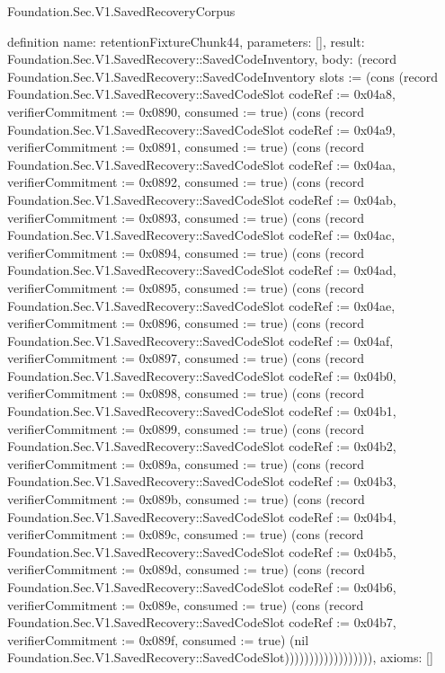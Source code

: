 \begin{lexlean}{Foundation.Sec.V1.SavedRecoveryCorpus}
\begin{semanticmodule}
definition{
  name: retentionFixtureChunk44,
  parameters: [],
  result: Foundation.Sec.V1.SavedRecovery::SavedCodeInventory,
  body: (record Foundation.Sec.V1.SavedRecovery::SavedCodeInventory {slots := (cons (record Foundation.Sec.V1.SavedRecovery::SavedCodeSlot {codeRef := 0x04a8, verifierCommitment := 0x0890, consumed := true}) (cons (record Foundation.Sec.V1.SavedRecovery::SavedCodeSlot {codeRef := 0x04a9, verifierCommitment := 0x0891, consumed := true}) (cons (record Foundation.Sec.V1.SavedRecovery::SavedCodeSlot {codeRef := 0x04aa, verifierCommitment := 0x0892, consumed := true}) (cons (record Foundation.Sec.V1.SavedRecovery::SavedCodeSlot {codeRef := 0x04ab, verifierCommitment := 0x0893, consumed := true}) (cons (record Foundation.Sec.V1.SavedRecovery::SavedCodeSlot {codeRef := 0x04ac, verifierCommitment := 0x0894, consumed := true}) (cons (record Foundation.Sec.V1.SavedRecovery::SavedCodeSlot {codeRef := 0x04ad, verifierCommitment := 0x0895, consumed := true}) (cons (record Foundation.Sec.V1.SavedRecovery::SavedCodeSlot {codeRef := 0x04ae, verifierCommitment := 0x0896, consumed := true}) (cons (record Foundation.Sec.V1.SavedRecovery::SavedCodeSlot {codeRef := 0x04af, verifierCommitment := 0x0897, consumed := true}) (cons (record Foundation.Sec.V1.SavedRecovery::SavedCodeSlot {codeRef := 0x04b0, verifierCommitment := 0x0898, consumed := true}) (cons (record Foundation.Sec.V1.SavedRecovery::SavedCodeSlot {codeRef := 0x04b1, verifierCommitment := 0x0899, consumed := true}) (cons (record Foundation.Sec.V1.SavedRecovery::SavedCodeSlot {codeRef := 0x04b2, verifierCommitment := 0x089a, consumed := true}) (cons (record Foundation.Sec.V1.SavedRecovery::SavedCodeSlot {codeRef := 0x04b3, verifierCommitment := 0x089b, consumed := true}) (cons (record Foundation.Sec.V1.SavedRecovery::SavedCodeSlot {codeRef := 0x04b4, verifierCommitment := 0x089c, consumed := true}) (cons (record Foundation.Sec.V1.SavedRecovery::SavedCodeSlot {codeRef := 0x04b5, verifierCommitment := 0x089d, consumed := true}) (cons (record Foundation.Sec.V1.SavedRecovery::SavedCodeSlot {codeRef := 0x04b6, verifierCommitment := 0x089e, consumed := true}) (cons (record Foundation.Sec.V1.SavedRecovery::SavedCodeSlot {codeRef := 0x04b7, verifierCommitment := 0x089f, consumed := true}) (nil Foundation.Sec.V1.SavedRecovery::SavedCodeSlot)))))))))))))))))}),
  axioms: []
}


\end{semanticmodule}
\end{lexlean}
